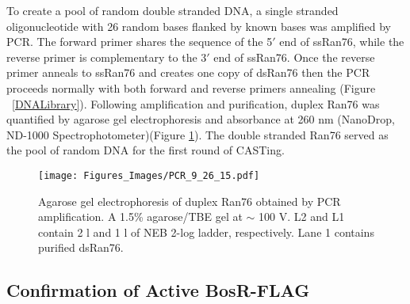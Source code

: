 \documentclass[12pt,twoside]{reedthesis}
\begin{document}
      To create a pool of random double stranded DNA, a single stranded oligonucleotide with 26 random bases flanked by known bases was amplified by PCR. The forward primer shares the sequence of the 5$'$ end of ssRan76, while the reverse primer is complementary to the 3$'$ end of ssRan76. Once the reverse primer anneals to ssRan76 and creates one copy of dsRan76 then the PCR proceeds normally with both forward and reverse primers annealing (Figure ~\ref{DNALibrary}). Following amplification and purification, duplex Ran76 was quantified by agarose gel electrophoresis and absorbance at 260 nm (NanoDrop\textsuperscript{\textregistered}, ND-1000 Spectrophotometer)(Figure \ref{PCRRan76}). The double stranded Ran76 served as the pool of random DNA for the first round of CASTing. 
    \begin{figure}[h!tbp]
    	\centering
    	\texttt{[image: Figures\_Images/PCR\_9\_26\_15.pdf]}
    	\caption[PCR to Create Pool of Random DNA]{Agarose gel electrophoresis of duplex Ran76 obtained by PCR amplification. A 1.5\% agarose/TBE gel at $\sim$ 100 V. L2 and L1 contain 2 \micro l and 1 \micro l of NEB 2-log ladder, respectively. Lane 1 contains purified dsRan76.}
    	\label{PCRRan76}
    \end{figure}
    
    
    \clearpage
    	  
      \subsection{Confirmation of Active BosR-FLAG}
      
\end{document}
